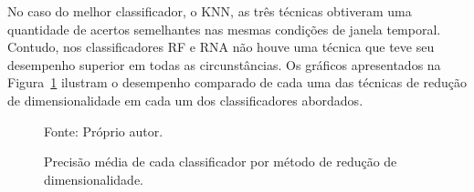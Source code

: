 No caso do melhor classificador, o KNN, as três técnicas obtiveram uma quantidade de acertos semelhantes nas mesmas condições de janela temporal. Contudo, nos classificadores RF e RNA não houve uma técnica que teve seu desempenho superior em todas as circunstâncias. Os gráficos apresentados na Figura~\ref{fig:reducao} ilustram o desempenho comparado de cada uma das técnicas de redução de dimensionalidade em cada um dos classificadores abordados.

\begin{figure}[!ht]
	\centering

	\caption{Precisão média de cada classificador por método de redução de dimensionalidade.}
	\label{fig:reducao}
	{\small Fonte: Próprio autor.} %
\end{figure}

